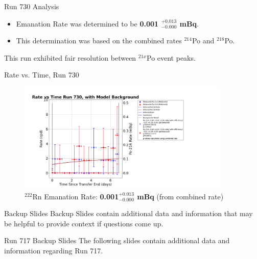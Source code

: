 \documentclass[aspectratio=169]{beamer}
\begin{document}
\begin{frame}{Run 730 Analysis}
    \begin{itemize}
        \item Emanation Rate was determined to be \textbf{0.001 $^{+0.013}_{-0.000}$ mBq}.
        \item This determination was based on the combined rates $^{214}$Po and $^{218}$Po.
    \end{itemize}
    This run exhibited fair resolution between $^{21x}$Po event peaks.

    \hyperlink{730_Backup}{}
\end{frame}

\begin{frame}{Rate vs. Time, Run 730}
\label{RvT_730}
    \begin{figure}
        \begin{center}
            \includegraphics[width=0.9\textwidth]
            {assets/730/RvT.png}
            \caption{$^{222}$Rn Emanation Rate: 
            \textbf{0.001$^{+0.013}_{-0.000}$ mBq} (from combined rate)}
        \end{center}
    \end{figure}    
\end{frame}

\begin{frame}{Backup Slides}
    Backup Slides contain additional data and information that may be helpful
    to provide context if questions come up.
\end{frame}

\begin{frame}{Run 717 Backup Slides}
\label{717_Backup}
    The following slides contain additional data and information regarding Run 717.
\end{frame}
\end{document}
